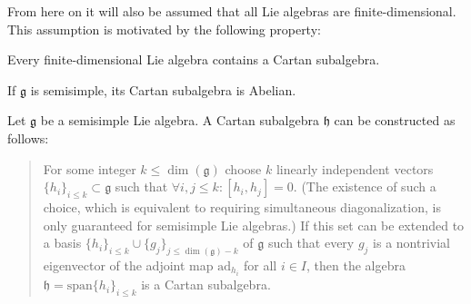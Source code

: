     From here on it will also be assumed that all Lie algebras are finite-dimensional. This assumption is motivated by the following property:
    \begin{property}
        Every finite-dimensional Lie algebra contains a Cartan subalgebra.
    \end{property}
    \begin{property}
       If $\mathfrak{g}$ is semisimple, its Cartan subalgebra is Abelian.
    \end{property}

    \begin{construct}
        Let $\mathfrak{g}$ be a semisimple Lie algebra. A Cartan subalgebra $\mathfrak{h}$ can be constructed as follows:
        \begin{quote}
            For some integer $k\leq\dim(\mathfrak{g})$ choose $k$ linearly independent vectors $\{h_i\}_{i\leq k}\subset\mathfrak{g}$ such that $\forall i,j\leq k:[h_i,h_j] = 0$. (The existence of such a choice, which is equivalent to requiring simultaneous diagonalization, is only guaranteed for semisimple Lie algebras.) If this set can be extended to a basis $\{h_i\}_{i\leq k}\cup\{g_j\}_{j\leq \dim(\mathfrak{g})-k}$ of $\mathfrak{g}$ such that every $g_j$ is a nontrivial eigenvector of the adjoint map $\text{ad}_{h_i}$ for all $i\in I$, then the algebra $\mathfrak{h} = \text{span}\{h_i\}_{i\leq k}$ is a Cartan subalgebra.
        \end{quote}
    \end{construct}


